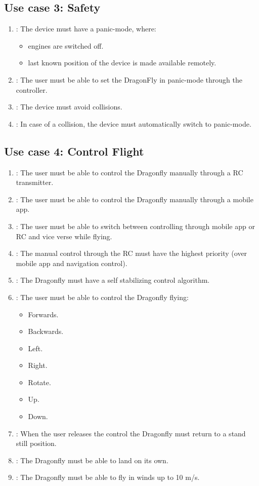 \documentclass[a4paper]{article}
\makeatletter
\newcommand{\labitem}[2]{%
\def\@itemlabel{\textbf{#2}}
\item
\def\@currentlabel{#2}\label{#1}}
\makeatother
\begin{document}
\subsection{Use case 3: Safety}

\begin{enumerate}
\labitem{req:safe.1}{Safety.1}: The device must have a panic-mode, where:
\begin{itemize}
\item engines are switched off.
\item last known position of the device is made available remotely.
\end{itemize}
\labitem{req:safe.2}{Safety.2}: The user must be able to set the DragonFly in panic-mode through the controller.
\labitem{req:safe.3}{Safety.3}: The device must avoid collisions.
\labitem{req:safe.4}{Safety.4}: In case of a collision, the device must automatically switch to panic-mode.
\end{enumerate}


\subsection{Use case 4: Control Flight}

\begin{enumerate}
\labitem{req:cf.1}{Control Flight.1}: The user must be able to control the Dragonfly manually through a RC transmitter.
\labitem{req:cf.2}{Control Flight.2}: The user must be able to control the Dragonfly manually through a mobile app.
\labitem{req:cf.3}{Control Flight.3}: The user must be able to switch between controlling through mobile app or RC and vice verse while flying.
\labitem{req:cf.4}{Control Flight.4}: The manual control through the RC must have the highest priority (over mobile app and navigation control).
\labitem{req:cf.5}{Control Flight.5}: The Dragonfly must have a self stabilizing control algorithm.
\labitem{req:cf.6}{Control Flight.6}: The user must be able to control the Dragonfly flying:
\begin{itemize}
\item Forwards.
\item Backwards.
\item Left.
\item Right.
\item Rotate.
\item Up.
\item Down.
\end{itemize}
\labitem{req:cf.7}{Control Flight.7}: When the user releases the control the Dragonfly must return to a stand still position.
\labitem{req:cf.8}{Control Flight.8}: The Dragonfly must be able to land on its own.
\labitem{req:cf.9}{Control Flight.9}: The Dragonfly must be able to fly in winds up to 10 m/s.
\end{enumerate}
\end{document}
